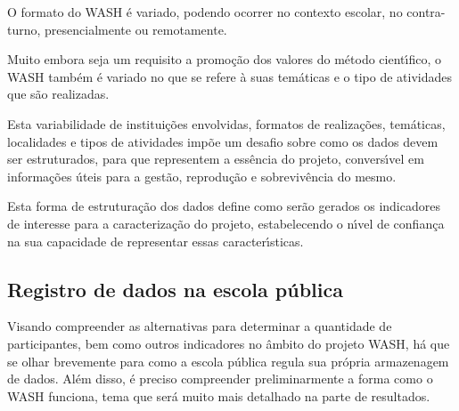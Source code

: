 \documentclass[
12pt,		%
openright,	%
twoside,  %
a4paper,			%
chapter=TITLE,		%
english,			%
french,				%
spanish,			%
brazil				%
]{USPSC-classe/USPSC_RedarTex}
\begin{document}
O formato do WASH \'e variado, podendo ocorrer no contexto escolar, no contra-turno, presencialmente ou remotamente.










Muito embora seja um requisito a promo\c{c}\~ao dos valores do m\'etodo cient\'{\i}fico, o WASH tamb\'em \'e variado no que se refere \`a suas tem\'aticas e o tipo de atividades que s\~ao realizadas.










Esta variabilidade de institui\c{c}\~oes envolvidas, formatos de realiza\c{c}\~oes, tem\'aticas, localidades e tipos de atividades imp\~oe um desafio sobre como os dados devem ser estruturados, para que representem a ess\^encia do projeto, convers\'{\i}vel em informa\c{c}\~oes \'uteis para a gest\~ao, reprodu\c{c}\~ao e sobreviv\^encia do mesmo.










Esta forma de estrutura\c{c}\~ao dos dados define como ser\~ao gerados os indicadores de interesse para a caracteriza\c{c}\~ao do projeto, estabelecendo o n\'{\i}vel de confian\c{c}a na sua capacidade de representar essas caracter\'{\i}sticas.










\subsection[Registro de dados na escola p\'ublica]{Registro de dados na escola p\'ublica}\label{Registro de dados na escola p\'ublica}
Visando compreender as alternativas para determinar a quantidade de participantes, bem como outros indicadores no \^ambito do projeto WASH, h\'a que se olhar brevemente para como a escola p\'ublica regula sua pr\'opria armazenagem de dados. Al\'em disso, \'e preciso compreender preliminarmente a forma como o WASH funciona, tema que ser\'a muito mais detalhado na parte de resultados.
\end{document}
